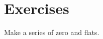 \renewcommand{\footerfilename}{Exercises.tex}

\section{Exercises}

Make a series of zero and flats.

